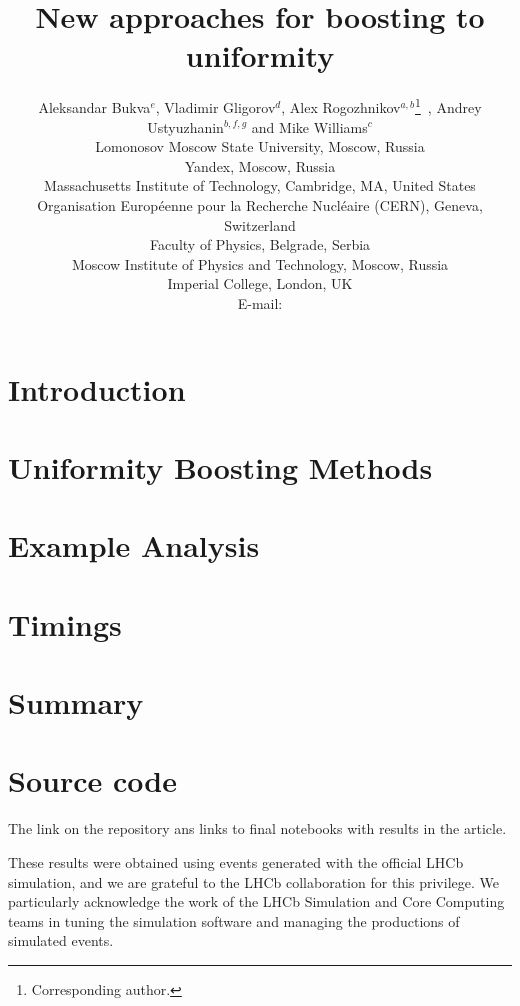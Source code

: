 \documentclass{JINST}
\title{New approaches for boosting to uniformity}
\author{
Aleksandar Bukva$^e$, 
Vladimir Gligorov$^d$,
Alex Rogozhnikov$^{a,b}$\thanks{Corresponding author.}~,\newline
Andrey Ustyuzhanin$^{b,f,g}$ and
Mike Williams$^c$\\
\llap{$^a$}Lomonosov Moscow State University, Moscow, Russia\\
\llap{$^b$}Yandex, Moscow, Russia\\
\llap{$^c$}Massachusetts Institute of Technology, Cambridge, MA, United States \\
\llap{$^d$}Organisation Europ\'eenne pour la Recherche Nucl\'eaire (CERN), Geneva, Switzerland  \\
\llap{$^e$}Faculty of Physics, Belgrade, Serbia \\
\llap{$^f$}Moscow Institute of Physics and Technology, Moscow, Russia\\
\llap{$^g$}Imperial College, London, UK\\
E-mail: \email{alex.rogozhnikov@yandex.ru}}
\theoremstyle{definition}
\theoremstyle{remark}
\begin{document}
\maketitle


\section{Introduction}



\section{Uniformity Boosting Methods}


\section{Example Analysis}




\section{Timings}



\section{Summary}



\section{Source code}


The link on the repository ans links to final notebooks with results in the article.

\acknowledgments

These results were obtained using events generated with the official LHCb simulation, and we are grateful to the LHCb collaboration for this privilege. 
We particularly acknowledge the work of the LHCb Simulation and Core Computing teams in tuning the simulation software and managing the productions of simulated events.
\end{document}
